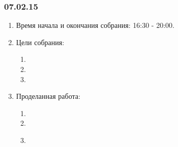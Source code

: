 \subsubsection{07.02.15}
\begin{enumerate}
	
	\item Время начала и окончания собрания: 16:30 - 20:00.
	
	\item Цели собрания: 
	\begin{enumerate}
		
		\item 
		
		\item 
		
        \item 
		
	\end{enumerate}

	\item Проделанная работа:
	\begin{enumerate}
		
		\item 
		
		\item 
		
        \item 
		
        \begin{figure}[H]
	  	  \begin{minipage}[h]{0.2\linewidth}
	  	    \center  
	  	  \end{minipage}
	  	  \begin{minipage}[h]{0.6\linewidth}
	  		\caption{}
	  	  \end{minipage}
	   \end{figure}


\end{enumerate}
\end{enumerate}
